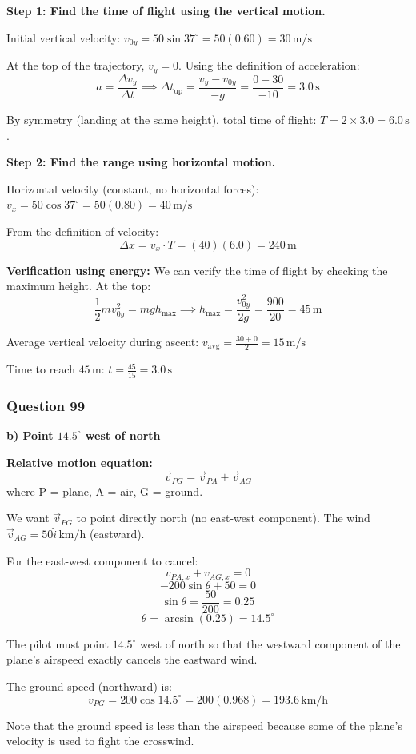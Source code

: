 \documentclass[12pt,letterpaper]{article}
\begin{document}
\begin{explanationbox}
\textbf{Step 1: Find the time of flight using the vertical motion.}

Initial vertical velocity: $v_{0y} = 50\sin 37^\circ = 50(0.60) = 30\,\text{m/s}$

At the top of the trajectory, $v_y = 0$. Using the definition of acceleration:
\[
a = \frac{\Delta v_y}{\Delta t} \implies \Delta t_{\text{up}} = \frac{v_y - v_{0y}}{-g} = \frac{0 - 30}{-10} = 3.0\,\text{s}
\]

By symmetry (landing at the same height), total time of flight: $T = 2 \times 3.0 = 6.0\,\text{s}$.

\textbf{Step 2: Find the range using horizontal motion.}

Horizontal velocity (constant, no horizontal forces): $v_x = 50\cos 37^\circ = 50(0.80) = 40\,\text{m/s}$

From the definition of velocity:
\[
\Delta x = v_x \cdot T = (40)(6.0) = 240\,\text{m}
\]

\textbf{Verification using energy:} We can verify the time of flight by checking the maximum height. At the top:
\[
\frac{1}{2}mv_{0y}^2 = mgh_{\max} \implies h_{\max} = \frac{v_{0y}^2}{2g} = \frac{900}{20} = 45\,\text{m}
\]

Average vertical velocity during ascent: $v_{\text{avg}} = \frac{30+0}{2} = 15\,\text{m/s}$

Time to reach $45\,\text{m}$: $t = \frac{45}{15} = 3.0\,\text{s}$ \checkmark
\end{explanationbox}

\subsubsection*{Question 99}

\begin{answerbox}
\textbf{b) Point $14.5^\circ$ west of north}
\end{answerbox}

\begin{explanationbox}
\textbf{Relative motion equation:}
\[
\vec{v}_{PG} = \vec{v}_{PA} + \vec{v}_{AG}
\]
where P = plane, A = air, G = ground.

We want $\vec{v}_{PG}$ to point directly north (no east-west component). The wind $\vec{v}_{AG} = 50\hat{i}\,\text{km/h}$ (eastward).

For the east-west component to cancel:
\[
v_{PA,x} + v_{AG,x} = 0
\]
\[
-200\sin\theta + 50 = 0
\]
\[
\sin\theta = \frac{50}{200} = 0.25
\]
\[
\theta = \arcsin(0.25) = 14.5^\circ
\]

The pilot must point $14.5^\circ$ west of north so that the westward component of the plane's airspeed exactly cancels the eastward wind.

The ground speed (northward) is:
\[
v_{PG} = 200\cos 14.5^\circ = 200(0.968) = 193.6\,\text{km/h}
\]

Note that the ground speed is less than the airspeed because some of the plane's velocity is used to fight the crosswind.
\end{explanationbox}
\end{document}
